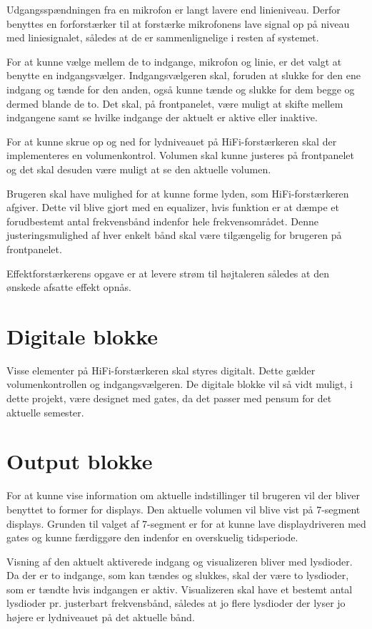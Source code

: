 Udgangsspændningen fra en mikrofon er langt lavere end linieniveau. Derfor benyttes en forforstærker til at forstærke mikrofonens lave signal op på niveau med liniesignalet, således at de er sammenlignelige i resten af systemet.

For at kunne vælge mellem de to indgange, mikrofon og linie, er det valgt at benytte en indgangsvælger. Indgangsvælgeren skal, foruden at slukke for den ene indgang og tænde for den anden, også kunne tænde og slukke for dem begge og dermed blande de to. Det skal, på frontpanelet, være muligt at skifte mellem indgangene samt se hvilke indgange der aktuelt er aktive eller inaktive. 

For at kunne skrue op og ned for lydniveauet på HiFi-forstærkeren skal der implementeres en volumenkontrol. Volumen skal kunne justeres på frontpanelet og det skal desuden være muligt at se den aktuelle volumen. 

Brugeren skal have mulighed for at kunne forme lyden, som HiFi-forstærkeren afgiver. Dette vil blive gjort med en equalizer, hvis funktion er at dæmpe et forudbestemt antal frekvensbånd indenfor hele frekvensområdet. Denne justeringsmulighed af hver enkelt bånd skal være tilgængelig for brugeren på frontpanelet. 

Effektforstærkerens opgave er at levere strøm til højtaleren således at den ønskede afsatte effekt opnås.

\section*{Digitale blokke}
Visse elementer på HiFi-forstærkeren skal styres digitalt. Dette gælder volumenkontrollen og indgangsvælgeren. De digitale blokke vil så vidt muligt, i dette projekt, være designet med gates, da det passer med pensum for det aktuelle semester. 


\section*{Output blokke}

For at kunne vise information om aktuelle indstillinger til brugeren vil der bliver benyttet to former for displays. 
Den aktuelle volumen vil blive vist på 7-segment displays. Grunden til valget af 7-segment er for at kunne lave displaydriveren med gates og kunne færdiggøre den indenfor en overskuelig tidsperiode. 

Visning af den aktuelt aktiverede indgang og visualizeren bliver med lysdioder. Da der er to indgange, som kan tændes og slukkes, skal der være to lysdioder, som er tændte hvis indgangen er aktiv. Visualizeren skal have et bestemt antal lysdioder pr. justerbart frekvensbånd, således at jo flere lysdioder der lyser jo højere er lydniveauet på det aktuelle bånd.
